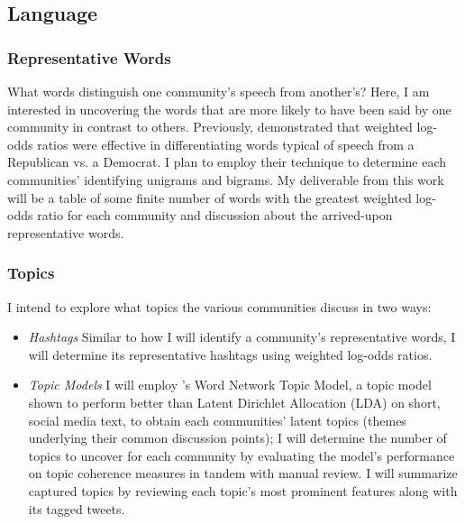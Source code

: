 \documentclass[acmlarge, screen, authorversion]{acmart}
\begin{document}
\subsection{Language}

\subsubsection{Representative Words}

What words distinguish one community's speech from another's? Here, I am interested in
uncovering the words that are more likely to have been said by one community in
contrast to others. Previously, \citet{monroeFightinWordsLexical2008}
demonstrated that weighted log-odds ratios were effective in differentiating
words typical of speech from a Republican vs. a Democrat. I plan to employ their
technique to determine each communities' identifying unigrams and
bigrams. My deliverable from this work will be a table of some finite number of
words with the greatest weighted log-odds ratio for each community and
discussion about the arrived-upon representative words.
\subsubsection{Topics}

I intend to explore what topics the various communities discuss in two ways:

\begin{itemize}
	\item \textit{Hashtags} Similar to how I will identify a community's representative words, I will determine its representative hashtags using weighted log-odds ratios.

	\item \textit{Topic Models} I will employ \citet{zuoWordNetworkTopic2016}'s Word
	Network Topic Model, a topic model shown to perform better than Latent
	Dirichlet Allocation (LDA) \cite{maierApplyingLDATopic2018} on short, social media text, to obtain
	each communities' latent topics (themes underlying their common discussion
	points); I will determine the number of topics to uncover for each community by
	evaluating the model's performance on topic coherence measures \cite{fangTopicsTweetsUser2016} in
	tandem with manual review. I will summarize captured topics by reviewing each
	topic's most prominent features along with its tagged tweets.

\end{itemize}
\end{document}

